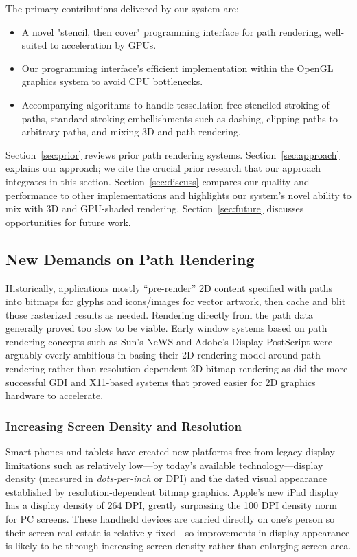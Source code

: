 The primary contributions delivered by our system are:
\begin{itemize}
  \item A novel "stencil, then cover" programming interface
  for path rendering, well-suited to acceleration by GPUs.
  \item Our programming interface's efficient implementation within the
  OpenGL graphics system to avoid CPU bottlenecks.
  \item Accompanying algorithms to handle tessellation-free stenciled stroking 
  of paths, standard stroking embellishments such
  as dashing, clipping paths to arbitrary paths, and mixing 3D and path
  rendering.
\end{itemize}
Section~\ref{sec:prior} reviews prior path rendering systems.
Section~\ref{sec:approach} explains our approach;
we cite the crucial prior research that our approach integrates in this section.
Section~\ref{sec:discuss} compares our quality and performance to other
implementations and highlights our system's novel ability to mix with 3D
and GPU-shaded rendering.  Section~\ref{sec:future} discusses opportunities for
future work.

\subsection{New Demands on Path Rendering}

Historically, applications mostly ``pre-render'' 2D content specified
with paths into bitmaps for glyphs and icons/images for vector artwork,
then cache and blit those rasterized results as needed.  Rendering
directly from the path data generally proved too slow to be viable.
Early window systems based on path rendering concepts such as Sun's NeWS
\cite{NeWS-Book} and Adobe's Display PostScript \cite{DisplayPostScript}
were arguably overly ambitious in basing their 2D rendering model around
path rendering rather than resolution-dependent 2D bitmap rendering as
did the more successful GDI and X11-based systems that proved easier
for 2D graphics hardware to accelerate.

\subsubsection{Increasing Screen Density and Resolution}

Smart phones and tablets have created new platforms
free from legacy display limitations such as relatively low---by today's available technology---display density
(measured in {\em dots-per-inch} or DPI) and the dated visual appearance established
by resolution-dependent bitmap graphics.  
Apple's new iPad display has a display density of 264 DPI, greatly surpassing
the 100 DPI density norm for PC screens.  These handheld devices
are carried directly on one's person so their screen real estate is
relatively fixed---so improvements in display appearance is likely to
be through increasing screen density rather than enlarging screen area.

